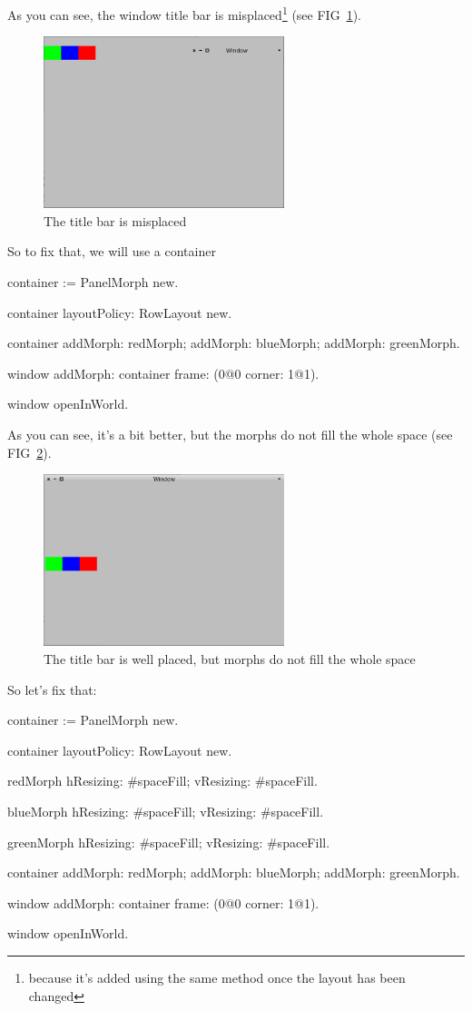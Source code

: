 \documentclass[a4paper,10pt,twoside]{book}
\begin{document}
As you can see, the window title bar is misplaced\footnote{because it's added using the same method once the layout has been changed} (see FIG~\ref{fig:rowLayout1}).

\begin{figure}[ht]\centering
	\includegraphics[width=7cm]{RowLayout1}
	\caption{The title bar is misplaced}
	\label{fig:rowLayout1}
\end{figure}

So to fix that, we will use a container
\begin{code}{}
container := PanelMorph new.

container layoutPolicy: RowLayout new.

container 
	addMorph: redMorph;
	addMorph: blueMorph;
	addMorph: greenMorph.

window
	addMorph: container
	frame: (0@0 corner: 1@1).

window openInWorld.
\end{code}

As you can see, it's a bit better, but the morphs do not fill the whole space (see FIG~\ref{fig:rowLayout2}).

\begin{figure}[ht]\centering
	\includegraphics[width=7cm]{RowLayout2}
	\caption{The title bar is well placed, but morphs do not fill the whole space}
	\label{fig:rowLayout2}
\end{figure}

So let's fix that:
\begin{code}{}
container := PanelMorph new.

container layoutPolicy: RowLayout new.

redMorph
	hResizing: #spaceFill;
	vResizing: #spaceFill.

blueMorph
	hResizing: #spaceFill;
	vResizing: #spaceFill.
	
greenMorph
	hResizing: #spaceFill;
	vResizing: #spaceFill.

container 
	addMorph: redMorph;
	addMorph: blueMorph;
	addMorph: greenMorph.

window
	addMorph: container
	frame: (0@0 corner: 1@1).

window openInWorld.
\end{code}
\end{document}
